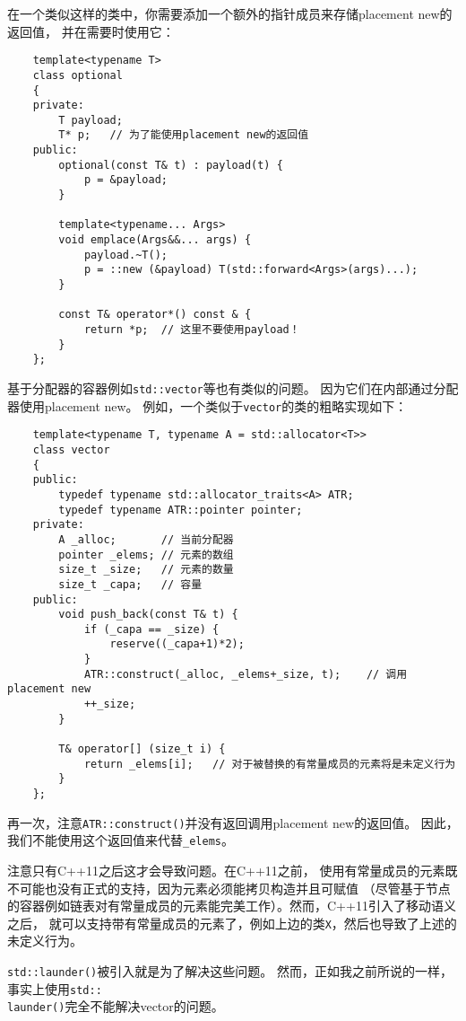 在一个类似这样的类中，你需要添加一个额外的指针成员来存储placement new的返回值，
并在需要时使用它：
\begin{lstlisting}
    template<typename T>
    class optional
    {
    private:
        T payload;
        T* p;   // 为了能使用placement new的返回值
    public:
        optional(const T& t) : payload(t) {
            p = &payload;
        }

        template<typename... Args>
        void emplace(Args&&... args) {
            payload.~T();
            p = ::new (&payload) T(std::forward<Args>(args)...);
        }

        const T& operator*() const & {
            return *p;  // 这里不要使用payload！
        }
    };
\end{lstlisting}
基于分配器的容器例如\texttt{std::vector}等也有类似的问题。
因为它们在内部通过分配器使用placement new。
例如，一个类似于\texttt{vector}的类的粗略实现如下：
\begin{lstlisting}
    template<typename T, typename A = std::allocator<T>>
    class vector
    {
    public:
        typedef typename std::allocator_traits<A> ATR;
        typedef typename ATR::pointer pointer;
    private:
        A _alloc;       // 当前分配器
        pointer _elems; // 元素的数组
        size_t _size;   // 元素的数量
        size_t _capa;   // 容量
    public:
        void push_back(const T& t) {
            if (_capa == _size) {
                reserve((_capa+1)*2);
            }
            ATR::construct(_alloc, _elems+_size, t);    // 调用placement new
            ++_size;
        }

        T& operator[] (size_t i) {
            return _elems[i];   // 对于被替换的有常量成员的元素将是未定义行为
        }
    };
\end{lstlisting}
再一次，注意\texttt{ATR::construct()}并没有返回调用placement new的返回值。
因此，我们不能使用这个返回值来代替\texttt{\_elems}。

注意只有C++11之后这才会导致问题。在C++11之前，
使用有常量成员的元素既不可能也没有正式的支持，因为元素必须能拷贝构造并且可赋值
（尽管基于节点的容器例如链表对有常量成员的元素能完美工作）。然而，C++11引入了移动语义之后，
就可以支持带有常量成员的元素了，例如上边的类\texttt{X}，然后也导致了上述的未定义行为。

\texttt{std::launder()}被引入就是为了解决这些问题。
然而，正如我之前所说的一样，事实上使用\texttt{std::\\
launder()}完全不能解决vector的问题。


